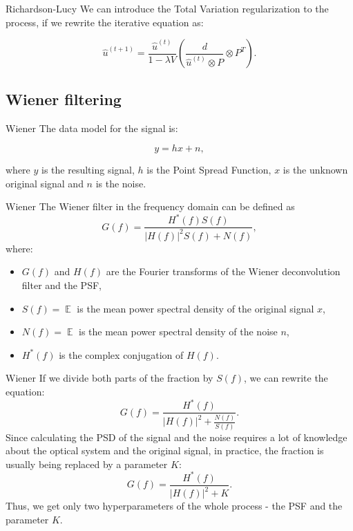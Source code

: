 \documentclass[aspectratio=1610]{beamer}
\begin{document}
\begin{frame}{Richardson-Lucy}
  We can introduce the Total Variation regularization to the process, if
  we rewrite the iterative equation as:
  
  $$
  \hat{u}^{(t+1)}=\frac{\hat{u}^{(t)}}{1 - \lambda V}
  (\frac{d}{\hat{u}^{(t)} \otimes P} \otimes P^T).
  $$
\end{frame}

\subsection {Wiener filtering}
\begin{frame}{Wiener}
  The data model for the signal is:
  
  $$
  y = hx + n,
  $$
  
  where $y$ is the resulting signal, $h$ is the Point Spread Function,
  $x$ is the unknown original signal and $n$ is the noise.
\end{frame}

\begin{frame}{Wiener}
  The Wiener filter in the frequency domain can be defined as
  $$
  G(f) = \frac{H^*(f)S(f)}{|H(f)|^2S(f)+N(f)},
  $$
  where:
  \begin{itemize}
    \item $G(f)$ and $H(f)$ are the Fourier transforms of 
      the Wiener deconvolution filter and the PSF,
    \item $S(f) = \mathop{\mathbb{E}|X(f)|^2}$ is the mean power spectral 
      density of the original signal $x$,
    \item $N(f) = \mathop{\mathbb{E}|X(f)|^2}$ is the mean power spectral 
      density of the noise $n$,
    \item $H^*(f)$ is the complex conjugation of $H(f)$.
  \end{itemize}
\end{frame}

\begin{frame}{Wiener}
  If we divide both parts of the fraction by $S(f)$, we can
  rewrite the equation:
  $$
  G(f) = \frac{H^*(f)}{|H(f)|^2+\frac{N(f)}{S(f)}}.
  $$
  Since calculating the PSD of the signal and the noise requires
  a lot of knowledge about the optical system and the original signal,
  in practice, the fraction is usually being replaced by a parameter $K$:
  $$
  G(f) = \frac{H^*(f)}{|H(f)|^2+K}.
  $$
  Thus, we get only two hyperparameters of the whole process - the PSF and
  the parameter $K$.
\end{frame}
\end{document}
